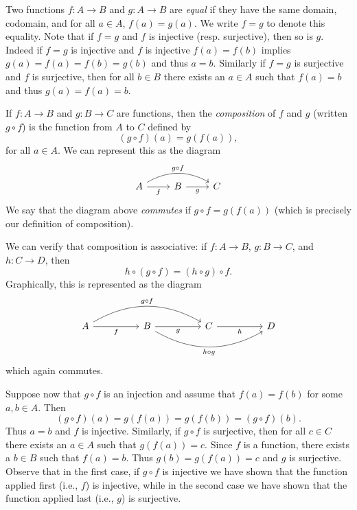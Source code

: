 \begin{remark}
    Two functions \(f: A \to B\) and \(g: A \to B\) are \emph{equal} if they
    have the same domain, codomain, and for all \(a \in A\), \(f(a) = g(a)\). We
    write \(f = g\) to denote this equality. Note that if \(f = g\) and \(f\) is
    injective (resp. surjective), then so is \(g\). Indeed if \(f = g\) is
    injective and \(f\) is injective \(f(a) = f(b)\) implies \(g(a) = f(a) =
    f(b) = g(b)\) and thus \(a = b\). Similarly if \(f = g\) is surjective and
    \(f\) is surjective, then for all \(b \in B\) there exists an \(a \in A\)
    such that \(f(a) = b\) and thus \(g(a) = f(a) = b\).
\end{remark}

\begin{sectionthm}
    If \(f: A \to B\) and \(g: B \to C\) are functions, then the
    \emph{composition} of \(f\) and \(g\) (written \(g \circ f\)) is the
    function from \(A\) to \(C\) defined by
    \[
        (g \circ f)(a) = g(f(a)),
    \]
    for all \(a \in A\). We can represent this as the diagram
    \[
        \begin{tikzcd}
            A \arrow[r, "f"'] \arrow[rr, "g \circ f", bend left] & B \arrow[r, "g"'] & C
        \end{tikzcd}
    \]
    We say that the diagram above \emph{commutes} if \(g \circ f = g(f(a))\)
    (which is precisely our definition of composition).

    We can verify that composition is associative: if \(f: A \to B\), \(g: B \to
    C\), and \(h: C \to D\), then
    \[
        h \circ (g \circ f) = (h \circ g) \circ f.
    \]
    Graphically, this is represented as the diagram
    \[
        \begin{tikzcd}
            A \arrow[rr, "f"'] \arrow[rrrr, "g \circ f", bend left] &  & B \arrow[rr, "g"'] \arrow[swap, rrrr, "h \circ g", bend right] &  & C \arrow[rr, "h"'] &  & D
        \end{tikzcd}
    \]
    which again commutes.

    Suppose now that \(g \circ f\) is an injection and assume that \(f(a) =
    f(b)\) for some \(a, b \in A\). Then
    \[
        (g \circ f)(a) = g(f(a)) = g(f(b)) = (g \circ f)(b).
    \]
    Thus \(a = b\) and \(f\) is injective. Similarly, if \(g \circ f\) is
    surjective, then for all \(c \in C\) there exists an \(a \in A\) such that
    \(g(f(a)) = c\). Since \(f\) is a function, there exists a \(b \in B\) such
    that \(f(a) = b\). Thus \(g(b) = g(f(a)) = c\) and \(g\) is surjective.
    Observe that in the first case, if \(g \circ f\) is injective we have shown
    that the function applied first (i.e., \(f\)) is injective, while in the
    second case we have shown that the function applied last (i.e., \(g\)) is
    surjective.
\end{sectionthm}

